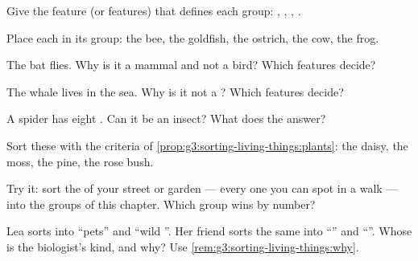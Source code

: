 \begin{exercise}[$\star$]\label{exo:g3:sorting-living-things:2}
Give the feature (or features) that defines each group: ,
, , .
\end{exercise}

\begin{exercise}[$\star$]\label{exo:g3:sorting-living-things:3}
Place each  in its group: the bee, the goldfish, the
ostrich, the cow, the frog.
\end{exercise}

\begin{exercise}[$\star$]\label{exo:g3:sorting-living-things:4}
The bat flies. Why is it a mammal and not a bird? Which features
decide?
\end{exercise}

\begin{exercise}[$\star$]\label{exo:g3:sorting-living-things:5}
The whale lives in the sea. Why is it not a ? Which features
decide?
\end{exercise}

\begin{exercise}[$\star$]\label{exo:g3:sorting-living-things:6}
A spider has eight . Can it be an insect? What does the
 answer?
\end{exercise}

\begin{exercise}[$\star$]\label{exo:g3:sorting-living-things:7}
Sort these  with the criteria of
\cref{prop:g3:sorting-living-things:plants}: the daisy, the moss,
the pine, the rose bush.
\end{exercise}

\begin{exercise}[$\star$]\label{exo:g3:sorting-living-things:8}
Try it: sort the  of your street or garden --- every one
you can spot in a walk --- into the groups of this chapter. Which
group wins by number?
\end{exercise}

\begin{exercise}[$\star\star$]\label{exo:g3:sorting-living-things:9}
Lea sorts  into ``pets'' and ``wild ''. Her friend
sorts the same  into ``'' and ``''. Whose
 is the biologist's kind, and why? Use
\cref{rem:g3:sorting-living-things:why}.
\end{exercise}

